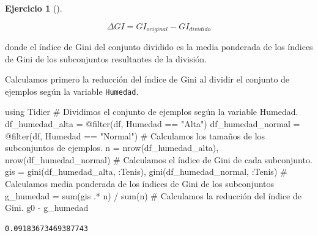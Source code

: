 \documentclass[
  a4paper,
]{scrreport}
\newenvironment{Shaded}{\begin{snugshade}}{\end{snugshade}}
\newcommand{\BuiltInTok}[1]{\textcolor[rgb]{0.00,0.23,0.31}{#1}}
\newcommand{\CommentTok}[1]{\textcolor[rgb]{0.37,0.37,0.37}{#1}}
\newcommand{\FunctionTok}[1]{\textcolor[rgb]{0.28,0.35,0.67}{#1}}
\newcommand{\ImportTok}[1]{\textcolor[rgb]{0.00,0.46,0.62}{#1}}
\newcommand{\NormalTok}[1]{\textcolor[rgb]{0.00,0.23,0.31}{#1}}
\newcommand{\OperatorTok}[1]{\textcolor[rgb]{0.37,0.37,0.37}{#1}}
\newcommand{\PreprocessorTok}[1]{\textcolor[rgb]{0.68,0.00,0.00}{#1}}
\newcommand{\StringTok}[1]{\textcolor[rgb]{0.13,0.47,0.30}{#1}}
\theoremstyle{definition}
\newtheorem{exercise}{Ejercicio}[chapter]
\theoremstyle{remark}
\begin{document}
\begin{exercise}[]
\begin{enumerate}
\begin{tcolorbox}
  \[ \Delta GI = GI_{original} - GI_{dividido} \]

  donde el índice de Gini del conjunto dividido es la media ponderada de
  los índices de Gini de los subconjuntos resultantes de la división.

  \end{tcolorbox}

  \begin{tcolorbox}[enhanced jigsaw, left=2mm, colback=white, coltitle=black, opacitybacktitle=0.6, titlerule=0mm, breakable, bottomrule=.15mm, toptitle=1mm, bottomtitle=1mm, colbacktitle=quarto-callout-tip-color!10!white, opacityback=0, rightrule=.15mm, title=\textcolor{quarto-callout-tip-color}{\faLightbulb}\hspace{0.5em}{Solución}, colframe=quarto-callout-tip-color-frame, arc=.35mm, leftrule=.75mm, toprule=.15mm]

  Calculamos primero la reducción del índice de Gini al dividir el
  conjunto de ejemplos según la variable \texttt{Humedad}.

\begin{Shaded}
\begin{Highlighting}[]
\ImportTok{using} \BuiltInTok{Tidier}
\CommentTok{\# Dividimos el conjunto de ejemplos según la variable Humedad.}
\NormalTok{df\_humedad\_alta }\OperatorTok{=} \PreprocessorTok{@filter}\NormalTok{(df, Humedad }\OperatorTok{==} \StringTok{"Alta"}\NormalTok{)}
\NormalTok{df\_humedad\_normal }\OperatorTok{=} \PreprocessorTok{@filter}\NormalTok{(df, Humedad }\OperatorTok{==} \StringTok{"Normal"}\NormalTok{)}
\CommentTok{\# Calculamos los tamaños de los subconjuntos de ejemplos.}
\NormalTok{n }\OperatorTok{=} \FunctionTok{nrow}\NormalTok{(df\_humedad\_alta), }\FunctionTok{nrow}\NormalTok{(df\_humedad\_normal)}
\CommentTok{\# Calculamos el índice de Gini de cada subconjunto.}
\NormalTok{gis }\OperatorTok{=} \FunctionTok{gini}\NormalTok{(df\_humedad\_alta, }\OperatorTok{:}\NormalTok{Tenis), }\FunctionTok{gini}\NormalTok{(df\_humedad\_normal, }\OperatorTok{:}\NormalTok{Tenis)}
\CommentTok{\# Calculamos media ponderada de los índices de Gini de los subconjuntos }
\NormalTok{g\_humedad }\OperatorTok{=} \FunctionTok{sum}\NormalTok{(gis }\OperatorTok{.*}\NormalTok{ n) }\OperatorTok{/} \FunctionTok{sum}\NormalTok{(n)}
\CommentTok{\# Calculamos la reducción del índice de Gini.}
\NormalTok{g0 }\OperatorTok{{-}}\NormalTok{ g\_humedad}
\end{Highlighting}
\end{Shaded}

\begin{verbatim}
0.09183673469387743
\end{verbatim}


\end{tcolorbox}
\end{enumerate}
\end{exercise}
\end{document}
